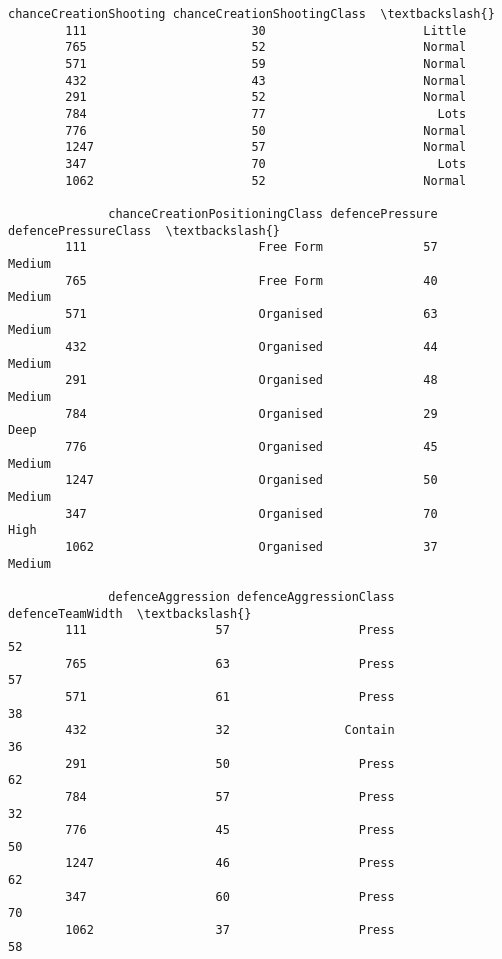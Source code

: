 \documentclass[11pt]{article}
\begin{document}
\begin{Verbatim}[commandchars=\\\{\}]
              chanceCreationShooting chanceCreationShootingClass  \textbackslash{}
        111                       30                      Little   
        765                       52                      Normal   
        571                       59                      Normal   
        432                       43                      Normal   
        291                       52                      Normal   
        784                       77                        Lots   
        776                       50                      Normal   
        1247                      57                      Normal   
        347                       70                        Lots   
        1062                      52                      Normal   
        
              chanceCreationPositioningClass defencePressure defencePressureClass  \textbackslash{}
        111                        Free Form              57               Medium   
        765                        Free Form              40               Medium   
        571                        Organised              63               Medium   
        432                        Organised              44               Medium   
        291                        Organised              48               Medium   
        784                        Organised              29                 Deep   
        776                        Organised              45               Medium   
        1247                       Organised              50               Medium   
        347                        Organised              70                 High   
        1062                       Organised              37               Medium   
        
              defenceAggression defenceAggressionClass  defenceTeamWidth  \textbackslash{}
        111                  57                  Press                52   
        765                  63                  Press                57   
        571                  61                  Press                38   
        432                  32                Contain                36   
        291                  50                  Press                62   
        784                  57                  Press                32   
        776                  45                  Press                50   
        1247                 46                  Press                62   
        347                  60                  Press                70   
        1062                 37                  Press                58   
        

\end{Verbatim}
\end{document}
